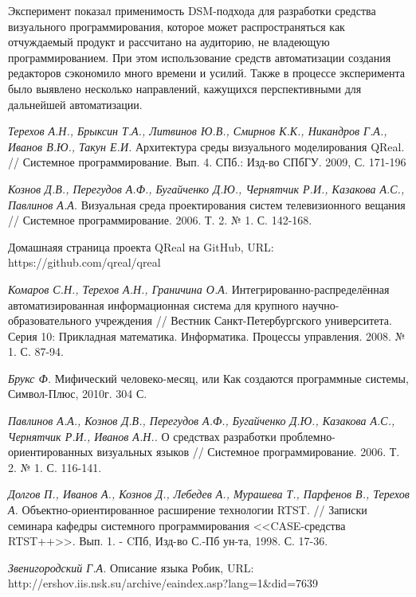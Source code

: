 \documentclass[a4paper]{article}
\begin{document}
Эксперимент показал применимость DSM-подхода для разработки средства визуального программирования, которое может распространяться как отчуждаемый продукт и рассчитано на аудиторию, не владеющую программированием. При этом использование средств автоматизации создания редакторов сэкономило много времени и усилий. Также в процессе эксперимента было выявлено несколько направлений, кажущихся перспективными для дальнейшей автоматизации.

\begin{thebibliography}{9001}

   \emph{Терехов А.Н., Брыксин Т.А., Литвинов Ю.В., Смирнов К.К., Никандров Г.А., Иванов В.Ю., Такун Е.И.} Архитектура среды визуального моделирования QReal. // Системное программирование. Вып. 4. СПб.: Изд-во СПбГУ. 2009, С. 171-196

   \emph{Кознов Д.В., Перегудов А.Ф., Бугайченко Д.Ю., Чернятчик Р.И., Казакова А.С., Павлинов А.А.} Визуальная среда проектирования систем телевизионного вещания // Системное программирование. 2006. Т. 2. № 1. С. 142-168.

   Домашнаяя страница проекта QReal на GitHub, URL: https://github.com/qreal/qreal 

   \emph{Комаров С.Н., Терехов А.Н., Граничина О.А.} Интегрированно-распределённая автоматизированная информационная система для крупного научно-образовательного учреждения // Вестник Санкт-Петербургского университета. Серия 10: Прикладная математика. Информатика. Процессы управления. 2008. № 1. С. 87-94. 

   \emph{Брукс Ф.} Мифический человеко-месяц, или Как создаются программные системы, Символ-Плюс, 2010г. 304 С.

   \emph{Павлинов А.А., Кознов Д.В., Перегудов А.Ф., Бугайченко Д.Ю., Казакова А.С., Чернятчик Р.И., Иванов А.Н..} О средствах разработки проблемно-ориентированных визуальных языков // Системное программирование. 2006. Т. 2. № 1. С. 116-141.

   \emph{Долгов П., Иванов А., Кознов Д., Лебедев А., Мурашева Т., Парфенов В., Терехов А.} Объектно-ориентированное расширение технологии RTST. // Записки семинара кафедры системного программирования <<CASE-средства RTST++>>. Вып. 1. - CПб, Изд-во С.-Пб ун-та, 1998. С. 17-36.

   \emph{Звенигородский Г.А.} Описание языка Робик, URL: http://ershov.iis.nsk.su/archive/eaindex.asp?lang=1\&did=7639 


\end{thebibliography}
\end{document}
